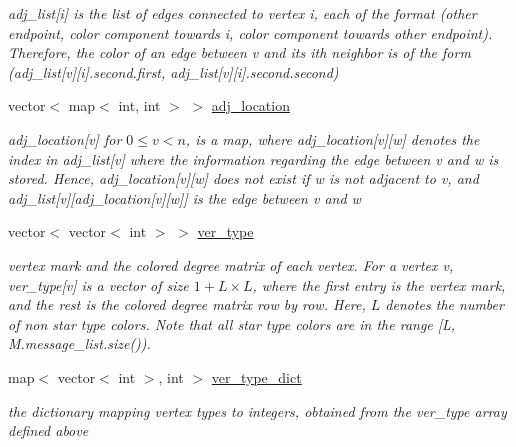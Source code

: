 \begin{DoxyCompactItemize}
\begin{DoxyCompactList}\small\item\em adj\+\_\+list\mbox{[}i\mbox{]} is the list of edges connected to vertex i, each of the format (other endpoint, color component towards i, color component towards other endpoint). Therefore, the color of an edge between v and its ith neighbor is of the form (adj\+\_\+list\mbox{[}v\mbox{]}\mbox{[}i\mbox{]}.second.\+first, adj\+\_\+list\mbox{[}v\mbox{]}\mbox{[}i\mbox{]}.second.\+second) \end{DoxyCompactList}\item 
vector$<$ map$<$ int, int $>$ $>$ \hyperlink{classcolored__graph_ad657e7e86bee874d19dbc1765e1edaa7}{adj\+\_\+location}
\begin{DoxyCompactList}\small\item\em adj\+\_\+location\mbox{[}v\mbox{]} for $0 \leq v < n$, is a map, where adj\+\_\+location\mbox{[}v\mbox{]}\mbox{[}w\mbox{]} denotes the index in adj\+\_\+list\mbox{[}v\mbox{]} where the information regarding the edge between v and w is stored. Hence, adj\+\_\+location\mbox{[}v\mbox{]}\mbox{[}w\mbox{]} does not exist if w is not adjacent to v, and adj\+\_\+list\mbox{[}v\mbox{]}\mbox{[}adj\+\_\+location\mbox{[}v\mbox{]}\mbox{[}w\mbox{]}\mbox{]} is the edge between v and w \end{DoxyCompactList}\item 
vector$<$ vector$<$ int $>$ $>$ \hyperlink{classcolored__graph_a2cc32e7146fa3319f83cfa940f5e1be4}{ver\+\_\+type}
\begin{DoxyCompactList}\small\item\em vertex mark and the colored degree matrix of each vertex. For a vertex v, ver\+\_\+type\mbox{[}v\mbox{]} is a vector of size $1 + L \times L$, where the first entry is the vertex mark, and the rest is the colored degree matrix row by row. Here, $L$ denotes the number of non star type colors. Note that all star type colors are in the range \mbox{[}L, M.\+message\+\_\+list.\+size()). \end{DoxyCompactList}\item 
map$<$ vector$<$ int $>$, int $>$ \hyperlink{classcolored__graph_aeb780762429ddac375799f4a45405712}{ver\+\_\+type\+\_\+dict}
\begin{DoxyCompactList}\small\item\em the dictionary mapping vertex types to integers, obtained from the ver\+\_\+type array defined above \end{DoxyCompactList}\item 

\end{DoxyCompactItemize}
